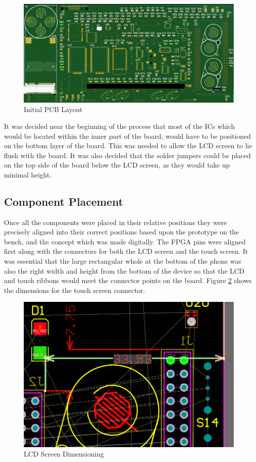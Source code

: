 \begin{figure}
	\includegraphics[width=\linewidth]{Figures/PCB.png}
	\caption{Initial PCB Layout}
	\label{fig:Initial_PCB}
\end{figure}

	It was decided near the beginning of the process that most of the ICs which would be located within the inner part of the board, would have to be positioned on the bottom layer of the board. 
This was needed to allow the LCD screen to lie flush with the board. 
It was also decided that the solder jumpers could be placed on the top side of the board below the LCD screen, as they would take up minimal height.\\

\subsection{Component Placement}
	Once all the components were placed in their relative positions they were precisely aligned into their correct positions based upon the prototype on the bench, and the concept which was made digitally. 
The FPGA pins were aligned first along with the connectors for both the LCD screen and the touch screen. 
It was essential that the large rectangular whole at the bottom of the phone was also the right width and height from the bottom of the device so that the LCD and touch ribbons would meet the connector points on the board. 
Figure \ref{fig:component_placement} shows the dimensions for the touch screen connector. 

\begin{figure}
	\includegraphics[width=\linewidth]{Figures/component_placement.png}\centering
	\caption{LCD Screen Dimensioning}
	\label{fig:component_placement}
\end{figure}

